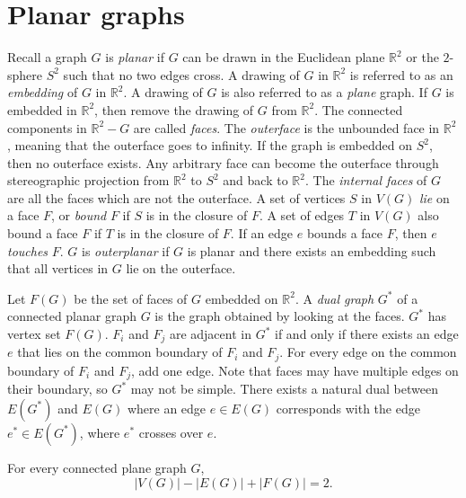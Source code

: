 \section{Planar graphs}\label{sec:Planar graphs}
Recall a graph \(G\) is \textit{planar} if \(G\) can be drawn in the Euclidean plane \( \mathbb{R}^2 \) or the $2$-sphere $S^2$ such that no two edges cross.  A drawing of $G$ in $\mathbb{R}^2$ is referred to as an \textit{embedding} of $G$ in $\mathbb{R}^2$. A drawing of $G$ is also referred to as a \textit{plane} graph. If \(G\) is embedded in \(\mathbb{R}^2 \), then remove the drawing of $G$ from $\mathbb{R}^2$. The connected components in $\mathbb{R}^2 - G$ are called \textit{faces}. The \textit{outerface} is the unbounded face in $\mathbb{R}^2$, meaning that the outerface goes to infinity. If the graph is embedded on $S^2$, then no outerface exists. Any arbitrary face can become the outerface through stereographic projection from $\mathbb{R}^2$ to $S^2$ and back to $\mathbb{R}^2$. The \textit{internal faces} of $G$ are all the faces which are not the outerface. A set of vertices $S$ in $V(G)$ \textit{lie} on a face $F$, or \textit{bound} $F$ if $S$ is in the closure of $F$. A set of edges $T$ in $V(G)$ also bound a face $F$ if $T$ is in the closure of $F$. If an edge $e$ bounds a face $F$, then $e$ \textit{touches} $F$. \(G\) is \textit{outerplanar} if \(G\) is planar and there exists an embedding such that all vertices in \(G\) lie on the outerface.

Let \(F(G)\) be the set of faces of \(G\) embedded on \(\mathbb{R}^2\). 
A \textit{dual graph} $G^*$ of a connected planar graph $G$ is the graph obtained by looking at the faces. $G^*$ has vertex set $F(G)$. $F_i$ and $F_j$ are adjacent in $G^*$ if and only if there exists an edge $e$ that lies on the common boundary of $F_i$ and $F_j$. For every edge on the common boundary of $F_i$ and $F_j$, add one edge. Note that faces may have multiple edges on their boundary, so $G^*$ may not be simple. There exists a natural dual between $E(G^*)$ and $E(G)$ where an edge $e \in E(G)$ corresponds with the edge $e^* \in E(G^*)$, where $e^*$ crosses over $e$. 

\begin{theorem}\label{thm:Euler_planar}
	For every connected plane graph $G$, 
	\begin{equation}
		|V(G)| - |E(G)| + |F(G)| = 2.
	\end{equation}
\end{theorem}

